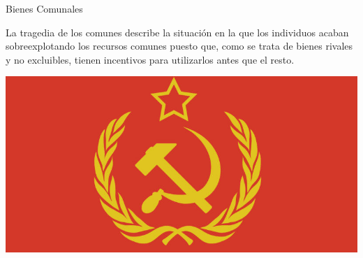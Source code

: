 \documentclass{beamer}
\begin{document}
\begin{frame}{Bienes Comunales}
    \begin{boxA}
        \centering
        La tragedia de los comunes describe la situación en la que los individuos acaban sobreexplotando los recursos comunes puesto que,
        como se trata de bienes rivales y no excluibles, tienen incentivos
        para utilizarlos antes que el resto.
    \end{boxA}
    \centering
    \includegraphics[scale=0.9]{../Figures/socialismo.jpg}
\end{frame}
\end{document}
